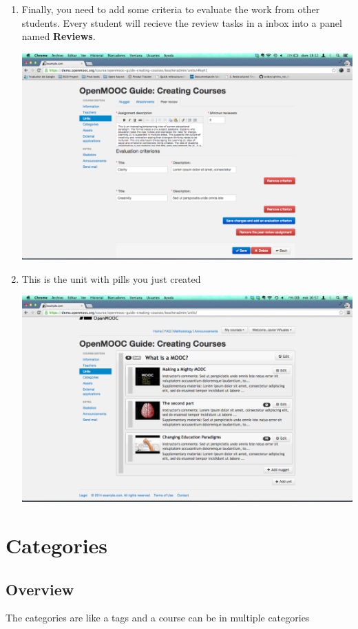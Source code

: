 \documentclass[letterpaper,10pt,english]{sphinxmanual}
\begin{document}
\begin{enumerate}
\item {} 
Finally, you need to add some criteria to evaluate the work from other students. Every student will recieve the review tasks in a inbox into a panel named \textbf{Reviews}.

\includegraphics{4_course_units-12b.png}

\item {} 
This is the unit with pills you just created

\includegraphics{4_course_units-13.png}

\end{enumerate}


\chapter{Categories}
\label{categories::doc}\label{categories:categories}\label{categories:id1}

\section{Overview}
\label{categories:overview}
The categories are like a tags and a course can be in multiple categories
\end{document}
